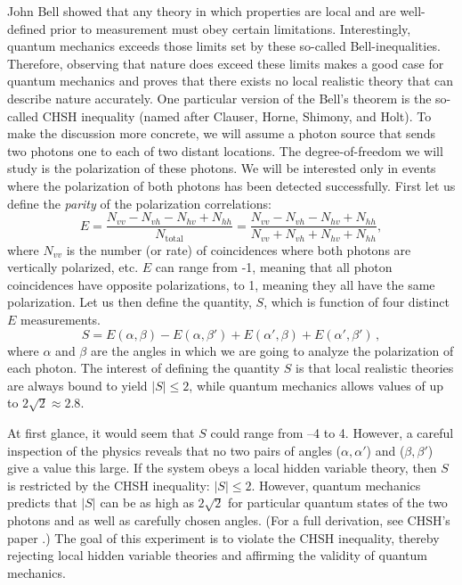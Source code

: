\documentclass{../lab}
\begin{document}
John Bell showed that any theory in which properties are local and are well-defined prior to measurement must obey certain limitations. Interestingly, quantum mechanics exceeds those limits set by these so-called Bell-inequalities. Therefore, observing that nature does exceed these limits makes a good case for quantum mechanics and proves that there exists no local realistic theory that can describe nature accurately. One particular version of the Bell's theorem is the so-called CHSH inequality (named after Clauser, Horne, Shimony, and Holt). To make the discussion more concrete, we will assume a photon source that sends two photons one to each of two distant locations. The degree-of-freedom we will study is the polarization of these photons. We will be interested only in events where the polarization of both photons has been detected successfully. First let us define the \emph{parity} of the polarization correlations:
\begin{equation}
    E = \frac{N_{vv}-N_{vh}-N_{hv}+N_{hh}}{N_\text{total}} = \frac{N_{vv} - N_{vh} - N_{hv} + N_{hh}}{N_{vv} + N_{vh} + N_{hv} + N_{hh}},
\end{equation}
where $N_{vv}$ is the number (or rate) of coincidences where both photons are vertically polarized, etc. $E$ can range from -1, meaning that all photon coincidences have opposite polarizations, to 1, meaning they all have the same polarization. Let us then define the quantity, $S$, which is function of four distinct $E$ measurements.
\begin{equation}
    S=E(\alpha,\beta)-E(\alpha,\beta') + E(\alpha',\beta) + E(\alpha',\beta') \,,
\end{equation}
where $\alpha$ and $\beta$ are the angles in which we are going to analyze the polarization of each photon. The interest of defining the quantity $S$ is that local realistic theories are always bound to yield $|S| \leq 2$, while quantum mechanics allows values of up to $2\sqrt{2} \approx 2.8$.

At first glance, it would seem that $S$ could range from –4 to 4. However, a careful inspection of the physics reveals that no two pairs of angles ($\alpha,\alpha'$) and ($\beta,\beta'$) give a value this large. If the system obeys a local hidden variable theory, then $S$ is restricted by the CHSH inequality: $|S| \leq 2$. However, quantum mechanics predicts that $|S|$ can be as high as $2\sqrt{2}$ for particular quantum states of the two photons and as well as carefully chosen angles. (For a full derivation, see CHSH's paper \cite{Clauser}.) The goal of this experiment is to violate the CHSH inequality, thereby rejecting local hidden variable theories and affirming the validity of quantum mechanics.
\end{document}
